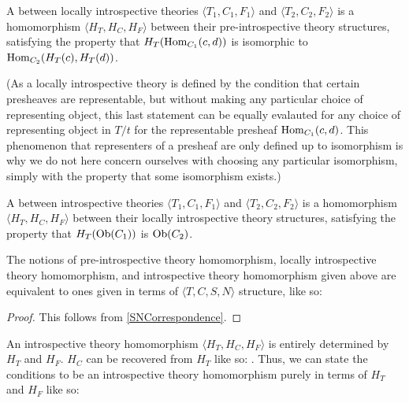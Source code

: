 \begin{definition}
A  between locally introspective theories $\langle T_1, C_1, F_1 \rangle$ and $\langle T_2, C_2, F_2 \rangle$ is a homomorphism $\langle H_T, H_C, H_F \rangle$ between their pre-introspective theory structures, satisfying the property that $H_T(\operatorname{Hom}_{C_1}(c, d))$ is isomorphic to $\operatorname{Hom}_{C_2}(H_T(c), H_T(d))$.


(As a locally introspective theory is defined by the condition that certain presheaves are representable, but without making any particular choice of representing object, this last statement can be equally evalauted for any choice of representing object in $T/t$ for the representable presheaf $\operatorname{Hom}_{C_1}(c, d)$. This phenomenon that representers of a presheaf are only defined up to isomorphism is why we do not here concern ourselves with choosing any particular isomorphism, simply with the property that some isomorphism exists.)
\end{definition}

\begin{definition}
A  between introspective theories $\langle T_1, C_1, F_1 \rangle$ and $\langle T_2, C_2, F_2 \rangle$ is a homomorphism $\langle H_T, H_C, H_F \rangle$ between their locally introspective theory structures, satisfying the property that $H_T(\operatorname{Ob}(C_1))$ is $\operatorname{Ob}(C_2)$.
\end{definition}

\begin{theorem}
The notions of pre-introspective theory homomorphism, locally introspective theory homomorphism, and introspective theory homomorphism given above are equivalent to ones given in terms of $\langle T, C, S, N \rangle$ structure, like so: \TODO
\end{theorem}
\begin{proof}
This follows from \cref{SNCorrespondence}.
\end{proof}

\begin{theorem}
An introspective theory homomorphism $\langle H_T, H_C, H_F \rangle$ is entirely determined by $H_T$ and $H_F$. $H_C$ can be recovered from $H_T$ like so: \TODO. Thus, we can state the conditions to be an introspective theory homomorphism purely in terms of $H_T$ and $H_F$ like so: \TODO
\end{theorem}

